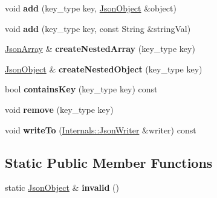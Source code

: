 \begin{DoxyCompactItemize}
\item 
\hypertarget{class_arduino_json_1_1_json_object_a9c74112c922e43b0492a4c68e3034b1e}{}void {\bfseries add} (key\+\_\+type key, \hyperlink{class_arduino_json_1_1_json_object}{Json\+Object} \&object)\label{class_arduino_json_1_1_json_object_a9c74112c922e43b0492a4c68e3034b1e}

\item 
\hypertarget{class_arduino_json_1_1_json_object_a684345edc36a9b976deda4a89b805cfa}{}void {\bfseries add} (key\+\_\+type key, const String \&string\+Val)\label{class_arduino_json_1_1_json_object_a684345edc36a9b976deda4a89b805cfa}

\item 
\hypertarget{class_arduino_json_1_1_json_object_ae6df7597287bfd9c78ceb2c24f54cec9}{}\hyperlink{class_arduino_json_1_1_json_array}{Json\+Array} \& {\bfseries create\+Nested\+Array} (key\+\_\+type key)\label{class_arduino_json_1_1_json_object_ae6df7597287bfd9c78ceb2c24f54cec9}

\item 
\hypertarget{class_arduino_json_1_1_json_object_a1021f29bda4f5b62ec091f963c45a0a0}{}\hyperlink{class_arduino_json_1_1_json_object}{Json\+Object} \& {\bfseries create\+Nested\+Object} (key\+\_\+type key)\label{class_arduino_json_1_1_json_object_a1021f29bda4f5b62ec091f963c45a0a0}

\item 
\hypertarget{class_arduino_json_1_1_json_object_aab277b5fe9e7854cd97e3ee740b7f22a}{}bool {\bfseries contains\+Key} (key\+\_\+type key) const \label{class_arduino_json_1_1_json_object_aab277b5fe9e7854cd97e3ee740b7f22a}

\item 
\hypertarget{class_arduino_json_1_1_json_object_a3587ee3976423029ed256c924c3ce0a5}{}void {\bfseries remove} (key\+\_\+type key)\label{class_arduino_json_1_1_json_object_a3587ee3976423029ed256c924c3ce0a5}

\item 
\hypertarget{class_arduino_json_1_1_json_object_a4b370c839a18cc7f062a01af11dc2fec}{}void {\bfseries write\+To} (\hyperlink{class_arduino_json_1_1_internals_1_1_json_writer}{Internals\+::\+Json\+Writer} \&writer) const \label{class_arduino_json_1_1_json_object_a4b370c839a18cc7f062a01af11dc2fec}

\end{DoxyCompactItemize}
\subsection*{Static Public Member Functions}
\begin{DoxyCompactItemize}
\item 
\hypertarget{class_arduino_json_1_1_json_object_a9ccb53f8ff85e1362269cdd259a2fe8b}{}static \hyperlink{class_arduino_json_1_1_json_object}{Json\+Object} \& {\bfseries invalid} ()\label{class_arduino_json_1_1_json_object_a9ccb53f8ff85e1362269cdd259a2fe8b}

\end{DoxyCompactItemize}
